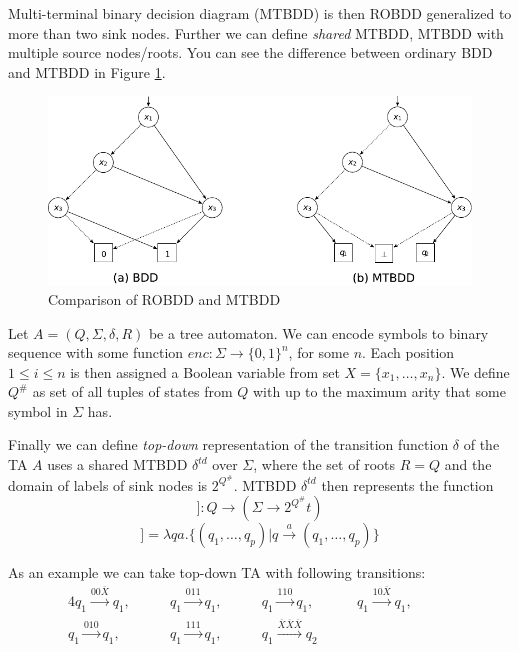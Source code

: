 \documentclass[a4paper, 12pt]{article}
\begin{document}
Multi-terminal binary decision diagram (MTBDD) is then ROBDD generalized to more than two sink nodes. Further we can define \textit{shared} MTBDD, MTBDD with multiple source nodes/roots. You can see the difference between ordinary BDD and MTBDD in Figure \ref{fig:15860}. %

\begin{figure}[h]
	\centering
	\includegraphics[width=0.7\linewidth]{15860.pdf}
	\caption{Comparison of ROBDD and MTBDD \cite{fiedor:wsks}}
	\label{fig:15860}
\end{figure}

Let $A=(Q, \Sigma, \delta, R)$ be a tree automaton. We can encode symbols to binary sequence with some function $enc: \Sigma \rightarrow \{0, 1\}^n$, for some $n$. Each position $1\leq i \leq n$ is then assigned a Boolean variable from set $X = \{x_1, \dots, x_n\}$. We define $Q^\#$ as set of all tuples of states from $Q$ with up to the maximum arity that some symbol in $\Sigma$ has.

Finally we can define \textit{top-down} representation of the transition function $\delta$ of the TA $A$ uses a shared MTBDD $\delta^{td}$ over $\Sigma$, where the set of roots $R=Q$ and the domain of labels of sink nodes is $2^{Q^\#}$. MTBDD $\delta^{td}$ then represents the function
\begin{equation*}
[[ \delta^{td}]]  : Q \rightarrow (\Sigma \rightarrow 2^{Q^\#}t)
\end{equation*}
\begin{equation*}
[[ \delta^{td}]]   = \lambda q a . \{(q_1, \dots, q_p) | q \xrightarrow{a} (q_1, \dots, q_p) \} 
\end{equation*}

As an example we can take top-down TA with following transitions:
\begin{alignat*}{4}
q_1 \xrightarrow{00\overline{X}} q_1, \qquad &
q_1 \xrightarrow{011} q_1, \qquad & 
q_1 \xrightarrow{110} q_1, \qquad &
q_1 \xrightarrow{10\overline{X}} q_1, \qquad & \\
q_1 \xrightarrow{010} q_1, \qquad &
q_1 \xrightarrow{111} q_1, \qquad &
q_1 \xrightarrow{\overline{X}\overline{X}\overline{X}} q_2 \qquad &  &\\
\end{alignat*}
\end{document}
